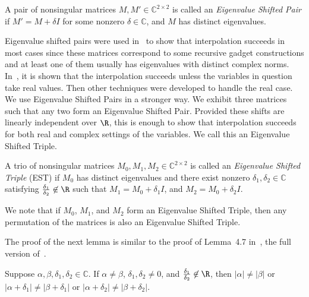 \documentclass[11pt]{article}
\begin{document}
\begin{definition}
 A pair of nonsingular matrices $M, M' \in \mathbb{C}^{2 \times 2}$ is called an \emph{Eigenvalue Shifted Pair}
 if $M' = M + \delta I$ for some nonzero $\delta \in \mathbb{C}$,
 and $M$ has distinct eigenvalues.
\end{definition}

Eigenvalue shifted pairs were used in~\cite{KC10} to show that interpolation succeeds in most cases
since these matrices correspond to some recursive gadget constructions and at least one of them usually has eigenvalues with distinct complex norms.
In~\cite{KC10},
it is shown that the interpolation succeeds unless the variables in question take real values.
Then other techniques were developed to handle the real case.
We use Eigenvalue Shifted Pairs in a stronger way.
We exhibit three matrices such that any two form an Eigenvalue Shifted Pair.
Provided these shifts are linearly independent over $\R$,
this is enough to show that interpolation succeeds for both real and complex settings of the variables.
We call this an Eigenvalue Shifted Triple.

\begin{definition}
 A trio of nonsingular matrices $M_0, M_1, M_2 \in \mathbb{C}^{2 \times 2}$ is called an \emph{Eigenvalue Shifted Triple} (EST)
 if $M_0$ has distinct eigenvalues and there exist nonzero $\delta_1, \delta_2 \in \mathbb{C}$ satisfying $\frac{\delta_1}{\delta_2} \not\in \R$
 such that $M_1 = M_0 + \delta_1 I$, and $M_2 = M_0 + \delta_2 I$.
\end{definition}

We note that if $M_0$, $M_1$, and $M_2$ form an Eigenvalue Shifted Triple,
then any permutation of the matrices is also an Eigenvalue Shifted Triple.

The proof of the next lemma is similar to the proof of Lemma~4.7 in~\cite{KC10_arXiv},
the full version of~\cite{KC10}.

\begin{lemma} \label{lem:binary:EST}
 Suppose $\alpha, \beta, \delta_1, \delta_2 \in \mathbb{C}$.
 If $\alpha \ne \beta$, $\delta_1, \delta_2 \ne 0$, and $\frac{\delta_1}{\delta_2} \not\in \R$,
 then $|\alpha| \ne |\beta|$ or $|\alpha + \delta_1| \ne |\beta + \delta_1|$ or $|\alpha + \delta_2| \ne |\beta + \delta_2|$.
\end{lemma}
\end{document}
